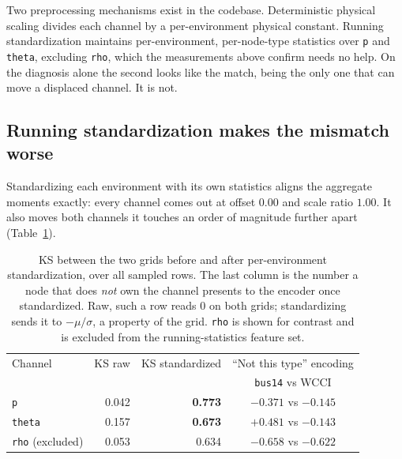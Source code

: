 Two preprocessing mechanisms exist in the codebase. Deterministic physical
scaling divides each channel by a per-environment physical constant. Running
standardization maintains per-environment, per-node-type statistics over
\texttt{p} and \texttt{theta}, excluding \texttt{rho}, which the measurements
above confirm needs no help. On the diagnosis alone the second looks like the
match, being the only one that can move a displaced channel. It is not.

\subsection{Running standardization makes the mismatch worse}
\label{sec:wcci-running-norm}

Standardizing each environment with its own statistics aligns the aggregate
moments exactly: every channel comes out at offset $0.00$ and scale ratio
$1.00$. It also moves both channels it touches an order of magnitude further
apart (Table~\ref{tab:wcci-running-norm}).

\begin{table}[H]
  \centering
  \small
  \caption{KS between the two grids before and after per-environment
  standardization, over all sampled rows. {\color{clarif}The last column is the
  number a node that does \emph{not} own the channel presents to the encoder
  once standardized. Raw, such a row reads $0$ on both grids; standardizing
  sends it to $-\mu/\sigma$, a property of the grid.} \texttt{rho} is shown for
  contrast and is excluded from the running-statistics feature set.}
  \label{tab:wcci-running-norm}
  \setlength{\tabcolsep}{8pt}
  \begin{tabular}{lrrc}
    \toprule
    Channel & KS raw & KS standardized & ``Not this type'' encoding \\
    & & & \texttt{bus14} vs WCCI \\
    \midrule
    \texttt{p}     & 0.042 & \textbf{0.773} & $-0.371$ vs $-0.145$ \\
    \texttt{theta} & 0.157 & \textbf{0.673} & $+0.481$ vs $-0.143$ \\
    \midrule
    \texttt{rho} (excluded) & 0.053 & 0.634 & $-0.658$ vs $-0.622$ \\
    \bottomrule
  \end{tabular}
\end{table}

